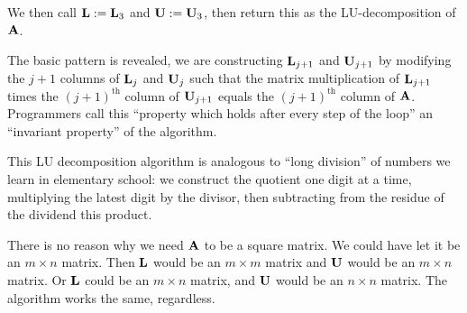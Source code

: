  We then call $\mathbf{L} := \mathbf{L}_{3}$ and
$\mathbf{U} := \mathbf{U}_{3}$, then return this as the LU-decomposition of
$\mathbf{A}$.

\begin{remark}
The basic pattern is revealed, we are constructing $\mathbf{L}_{j+1}$ and
$\mathbf{U}_{j+1}$ by modifying the $j+1$ columns of $\mathbf{L}_{j}$ and
$\mathbf{U}_{j}$ such that the matrix multiplication of $\mathbf{L}_{j+1}$
times the $(j+1)^{\text{th}}$ column of $\mathbf{U}_{j+1}$ equals the
$(j+1)^{\text{th}}$ column of $\mathbf{A}$. Programmers call this
``property which holds after every step of the loop'' an
``invariant property'' of the algorithm.
\end{remark}

\begin{remark}
This LU decomposition algorithm is analogous to ``long division'' of
numbers we learn in elementary school: we construct the quotient one
digit at a time, multiplying the latest digit by the divisor, then
subtracting from the residue of the dividend this product.
\end{remark}

There is no reason why we need $\mathbf{A}$ to be a square matrix. We could
have let it be an $m\times n$ matrix.
Then $\mathbf{L}$ would be an $m\times m$ matrix and $\mathbf{U}$ would be an
$m\times n$ matrix. Or $\mathbf{L}$ could be an $m\times n$ matrix, and
$\mathbf{U}$ would be an $n\times n$ matrix. The algorithm works the same,
regardless.

